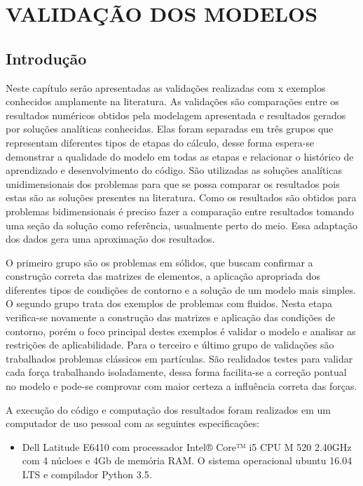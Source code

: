 \chapter{VALIDAÇÃO DOS MODELOS}
\label{validacao}
\section{\textbf{Introdução}}
Neste capítulo serão apresentadas as validações realizadas com x exemplos conhecidos amplamente na literatura.
As validações são comparações entre os resultados numéricos obtidos pela modelagem apresentada e resultados gerados por soluções analíticas conhecidas. Elas foram separadas em três grupos que representam diferentes tipos de etapas do cálculo, desse forma espera-se demonstrar a qualidade do modelo em todas as etapas e relacionar o histórico de aprendizado e desenvolvimento do código.
São utilizadas as soluções analíticas unidimensionais dos problemas para que se possa comparar os resultados pois estas são as soluções presentes na literatura. Como os resultados são obtidos para problemas bidimensionais é preciso fazer a comparação entre resultados tomando uma seção da solução como referência, usualmente perto do meio. Essa adaptação dos dados gera uma aproximação dos resultados.

O primeiro grupo são os problemas em sólidos, que buscam confirmar a construção correta das matrizes de elementos, a aplicação apropriada dos diferentes tipos de condições de contorno e a solução de um modelo mais simples.
O segundo grupo trata dos exemplos de problemas com fluidos. 
Nesta etapa verifica-se novamente a construção das matrizes e aplicação das condições de contorno, 
porém o foco principal destes exemplos é validar o modelo e analisar as restrições de aplicabilidade.
Para o terceiro e último grupo de validações são trabalhados problemas clássicos em partículas.
São realidados testes para validar cada força trabalhando isoladamente, dessa forma facilita-se a correção pontual no modelo e pode-se comprovar com maior certeza a influência correta das forças.

A execução do código e computação dos resultados foram realizados em um computador de uso pessoal com as seguintes especificações:
\begin{itemize}
    \item Dell Latitude E6410 com processador Intel® Core™ i5 CPU M 520 2.40GHz com 4 núcloes e 4Gb de memória RAM.
          O sistema operacional ubuntu 16.04 LTS e compilador Python 3.5.
\end{itemize}

